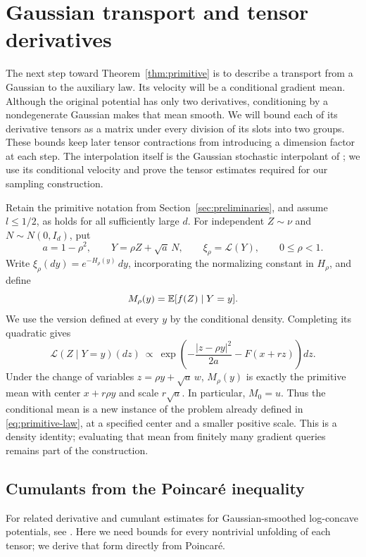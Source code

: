 \section{Gaussian transport and tensor derivatives}
\label{sec:jets}

The next step toward Theorem~\ref{thm:primitive} is to describe a
transport from a Gaussian to the auxiliary law. Its velocity will be a
conditional gradient mean. Although the original potential has only two
derivatives, conditioning by a nondegenerate Gaussian makes that mean
smooth. We will bound each of its derivative tensors as a matrix under
every division of its slots into two groups. These bounds keep later
tensor contractions from introducing a dimension factor at each step.
The interpolation itself is the Gaussian stochastic interpolant of
\citet[Section~5.1, Equations~(5.5)--(5.6)]{albergo2025interpolants};
we use its conditional velocity and prove the tensor estimates required
for our sampling construction.

Retain the primitive notation from Section~\ref{sec:preliminaries}, and assume
$l\le 1/2$, as holds for all sufficiently large $d$.  For independent
$Z\sim\nu$ and $N\sim N(0,I_d)$, put
\[
 a=1-\rho^2,\qquad Y=\rho Z+\sqrt a\,N,\qquad
 \xi_\rho=\mathcal L(Y),\qquad 0\le\rho<1.
\]
Write $\xi_\rho(dy)=e^{-H_\rho(y)}\,dy$, incorporating the normalizing
constant in $H_\rho$, and define
\[
 M_\rho(y)=\mathbb E[f(Z)\mid Y=y].
\]
We use the version defined at every $y$ by the conditional density.
Completing its quadratic gives
\begin{equation}
 \mathcal L(Z\mid Y=y)(dz)
 \ \propto\
 \exp\left(-\frac{|z-\rho y|^2}{2a}-F(x+rz)\right)dz.
 \label{eq:conditional-tilt}
\end{equation}
Under the change of variables $z=\rho y+\sqrt a\,w$, $M_\rho(y)$ is
exactly the primitive mean with center $x+r\rho y$ and scale $r\sqrt a$.
In particular, $M_0=u$.
Thus the conditional mean is a new instance of the problem already
defined in \eqref{eq:primitive-law}, at a specified center and a smaller
positive scale. This is a density identity; evaluating that mean from
finitely many gradient queries remains part of the construction.

\subsection{Cumulants from the Poincar\'e inequality}

For related derivative and cumulant estimates for Gaussian-smoothed
log-concave potentials, see \citet[Appendix~C.2]{chen2026picard}.
Here we need bounds for every nontrivial unfolding of each tensor;
we derive that form directly from Poincar\'e.

